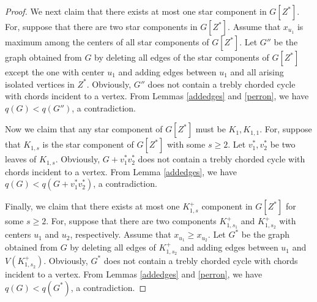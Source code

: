 \documentclass[10pt,a4paper]{amsart}
\begin{document}
\begin{proof}
We next claim that there exists at most one star component in $G[Z^*]$.
For, suppose that there are two star components in $G[Z^*]$.
Assume that $x_{u_1}$  is maximum among the centers of all star components of $G[Z^*]$.
Let $G''$ be the graph obtained from $G$ by deleting all edges of the star components of $G[Z^*]$ except the one with center $u_1$ and adding edges between $u_1$ and all arising isolated vertices in $Z^*$.
Obviously, $G''$ does not contain a trebly chorded cycle with chords incident to a vertex.
From Lemmas \ref{addedges} and \ref{perron}, we have $q(G)<q(G'')$, a contradiction.

Now we claim that any star component of $G[Z^*]$ must be $K_1, K_{1,1}$. For,
suppose that $K_{1,s}$ is the star component of $G[Z^*]$ with some $s\ge 2$. Let $v_1^*,v_2^*$ be two leaves of $K_{1,s}$.
Obviously, $G+v_1^*v_2^*$ does not contain a trebly chorded cycle with chords incident to a vertex.
From Lemma \ref{addedges}, we have $q(G)<q(G+v_1^*v_2^*)$, a contradiction.




Finally, we claim that there exists at most one $K_{1,s}^+$ component in $G[Z^*]$ for some $s\ge 2$.
For, suppose that there are two components $K_{1,s_1}^+$ and $K_{1,s_2}^+$ with centers  $u_1$ and $u_2$, respectively.  Assume that $x_{u_1}\ge x_{u_2}$.
Let $G^*$ be the graph obtained from $G$ by deleting all edges of $K_{1,s_2}^+$ and adding edges between $u_1$ and $V(K_{1,s_2}^+)$.
Obviously, $G^*$ does not contain a trebly chorded cycle with chords incident to a vertex.
From Lemmas \ref{addedges} and \ref{perron}, we have $q(G)<q(G^*)$, a contradiction.


\end{proof}
\end{document}

